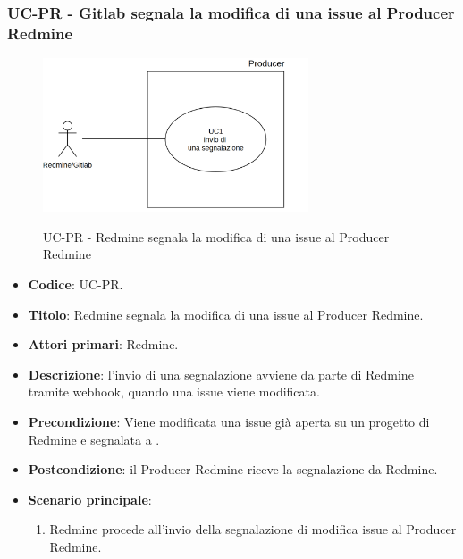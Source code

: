 	\subsubsection{UC\theuccount-PR - Gitlab segnala la modifica di una issue al Producer Redmine}
	\begin{figure}[H]
		\centering
		\includegraphics[width=0.7\textwidth]{img/UC1.png}\\
		\caption{UC\theuccount-PR - Redmine segnala la modifica di una issue al Producer Redmine}
	\end{figure}
	\begin{itemize}
		\item \textbf{Codice}: UC\theuccount-PR.
		\item \textbf{Titolo}: Redmine segnala la modifica di una issue al Producer Redmine.
		\item \textbf{Attori primari}: Redmine.
		\item \textbf{Descrizione}: l'invio di una segnalazione avviene
		da parte di Redmine tramite webhook, quando una issue viene modificata.
		\item \textbf{Precondizione}: Viene modificata una issue già aperta su un
		progetto di Redmine e segnalata a \progetto.
		\item \textbf{Postcondizione}: il Producer Redmine riceve la segnalazione da Redmine.
		\item \textbf{Scenario principale}: 
		\begin{enumerate}
			\item Redmine procede all'invio della segnalazione di modifica issue al Producer Redmine.
		\end{enumerate}
		
	\end{itemize}